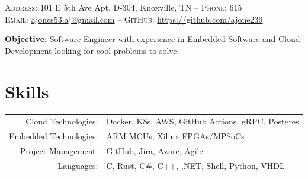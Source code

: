\documentclass[a4paper,10pt]{article}
\begin{document}
\pagestyle{empty} %


\par{\smallskip{}
\par{\small \textsc{Address:} 101 E 5th Ave Apt. D-304, Knoxville, TN \---
\small \textsc{Phone:} 615\\
\textsc{Email:} \href{mailto:ajones53.aj@gmail.com}{ajones53.aj@gmail.com} \---
\textsc{GitHub:} \href{https://github.com/ajone239}{https://github.com/ajone239}
} \smallskip{}
\par{\textbf{\underline{Objective}}: Software Engineer with experience in Embedded Software and Cloud Development looking for cool problems to solve.
}\smallskip}{}


\section{Skills}
\begin{tabularx}{\textwidth}{rl}
    Cloud Technologies: & Docker, K8s, AWS, GitHub Actions, gRPC, Postgres \\
    Embedded Technologies: & ARM MCUs, Xilinx FPGAs/MPSoCs \\
    Project Management: & GitHub, Jira, Azure, Agile \\
    Languages: & C, Rust, C\#, C++, .NET, Shell, Python, VHDL \\
\end{tabularx}

\end{document}
